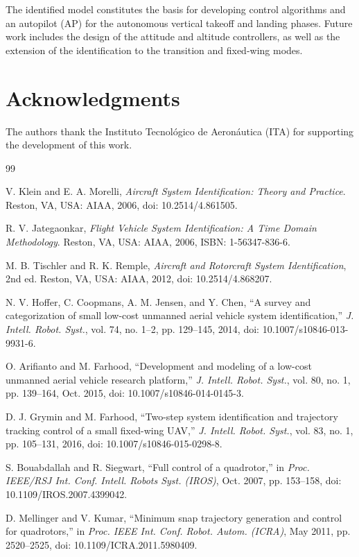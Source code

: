 \documentclass{ieeeaccess}
\begin{document}
The identified model constitutes the basis for developing control algorithms and an autopilot (AP) for the autonomous vertical takeoff and landing phases. Future work includes the design of the attitude and altitude controllers, as well as the extension of the identification to the transition and fixed-wing modes.

\section*{Acknowledgments}
The authors thank the Instituto Tecnológico de Aeronáutica (ITA) for supporting the development of this work.

\begin{thebibliography}{99}

 V. Klein and E. A. Morelli, \textit{Aircraft System Identification: Theory and Practice}. Reston, VA, USA: AIAA, 2006, doi: 10.2514/4.861505.

 R. V. Jategaonkar, \textit{Flight Vehicle System Identification: A Time Domain Methodology}. Reston, VA, USA: AIAA, 2006, ISBN: 1-56347-836-6.

 M. B. Tischler and R. K. Remple, \textit{Aircraft and Rotorcraft System Identification}, 2nd ed. Reston, VA, USA: AIAA, 2012, doi: 10.2514/4.868207.

 N. V. Hoffer, C. Coopmans, A. M. Jensen, and Y. Chen, ``A survey and categorization of small low-cost unmanned aerial vehicle system identification,'' \textit{J. Intell. Robot. Syst.}, vol. 74, no. 1--2, pp. 129--145, 2014, doi: 10.1007/s10846-013-9931-6.

 O. Arifianto and M. Farhood, ``Development and modeling of a low-cost unmanned aerial vehicle research platform,'' \textit{J. Intell. Robot. Syst.}, vol. 80, no. 1, pp. 139--164, Oct. 2015, doi: 10.1007/s10846-014-0145-3.

 D. J. Grymin and M. Farhood, ``Two-step system identification and trajectory tracking control of a small fixed-wing UAV,'' \textit{J. Intell. Robot. Syst.}, vol. 83, no. 1, pp. 105--131, 2016, doi: 10.1007/s10846-015-0298-8.

 S. Bouabdallah and R. Siegwart, ``Full control of a quadrotor,'' in \textit{Proc. IEEE/RSJ Int. Conf. Intell. Robots Syst. (IROS)}, Oct. 2007, pp. 153--158, doi: 10.1109/IROS.2007.4399042.

 D. Mellinger and V. Kumar, ``Minimum snap trajectory generation and control for quadrotors,'' in \textit{Proc. IEEE Int. Conf. Robot. Autom. (ICRA)}, May 2011, pp. 2520--2525, doi: 10.1109/ICRA.2011.5980409.


\end{thebibliography}
\end{document}
